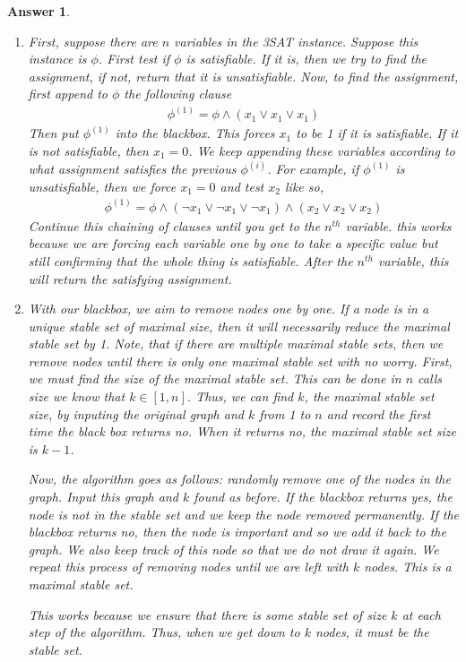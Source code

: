 \documentclass[12pt]{article}
\theoremstyle{colon}
\newtheorem*{answer}{Answer}
\begin{document}
\begin{answer}
  \leavevmode
  \begin{enumerate}[label=\arabic*)]
    \item First, suppose there are $n$ variables in the 3SAT instance. Suppose this instance is $\phi$. First test if $\phi$ is satisfiable. If it is, then we try to find the assignment, if not, return that it is unsatisfiable. Now, to find the assignment, first append to $\phi$ the following clause
      \begin{gather*}
        \phi^{(1)} = \phi \land (x_1 \lor x_1 \lor x_1)
      \end{gather*}
      Then put $\phi^{(1)}$ into the blackbox. This forces $x_1$ to be 1 if it is satisfiable. If it is not satisfiable, then $x_1 = 0$. We keep appending these variables according to what assignment satisfies the previous $\phi^{(i)}$. For example, if $\phi^{(1)}$ is unsatisfiable, then we force $x_1 = 0$ and test $x_2$ like so,
      \begin{gather*}
        \phi^{(1)} = \phi \land (\neg x_1 \lor \neg x_1 \lor \neg x_1) \land (x_2 \lor x_2 \lor x_2)
      \end{gather*}
      Continue this chaining of clauses until you get to the $n^{th}$ variable. this works because we are forcing each variable one by one to take a specific value but still confirming that the whole thing is satisfiable. After the $n^{th}$ variable, this will return the satisfying assignment.

    \item With our blackbox, we aim to remove nodes one by one. If a node is in a unique stable set of maximal size, then it will necessarily reduce the maximal stable set by 1. Note, that if there are multiple maximal stable sets, then we remove nodes until there is only one maximal stable set with no worry. First, we must find the size of the maximal stable set. This can be done in $n$ calls size we know that $k \in [1,n]$. Thus, we can find $k$, the maximal stable set size, by inputing the original graph and $k$ from 1 to $n$ and record the first time the black box returns no. When it returns no, the maximal stable set size is $k-1$.

      Now, the algorithm goes as follows: randomly remove one of the nodes in the graph. Input this graph and $k$ found as before. If the blackbox returns yes, the node is not in the stable set and we keep the node removed permanently. If the blackbox returns no, then the node is important and so we add it back to the graph. We also keep track of this node so that we do not draw it again. We repeat this process of removing nodes until we are left with $k$ nodes. This is a maximal stable set.

      This works because we ensure that there is some stable set of size $k$ at each step of the algorithm. Thus, when we get down to $k$ nodes, it must be the stable set.
  \end{enumerate}
\end{answer}
\end{document}
